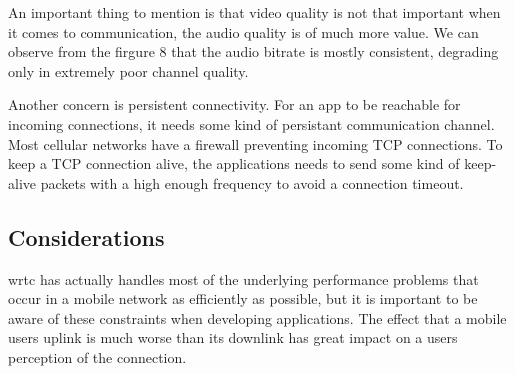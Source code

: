 An important thing to mention is that video quality is not that important when it comes to communication, the audio quality is of much more value. We can observe from the firgure 8 that the audio bitrate is mostly consistent, degrading only in extremely poor channel quality.

Another concern is persistent connectivity. For an app to be reachable for incoming connections, it needs some kind of persistant communication channel. Most cellular networks have a firewall preventing incoming TCP connections\cite{isomaki2012considerations}. To keep a TCP connection alive, the applications needs to send some kind of keep-alive packets with a high enough frequency to avoid a connection timeout.
\subsection{Considerations}



\gls{wrtc} has actually handles most of the underlying performance problems that occur in a mobile network as efficiently as possible, but it is important to be aware of these constraints when developing applications. The effect that a mobile users uplink is much worse than its downlink has great impact on a users perception of the connection.